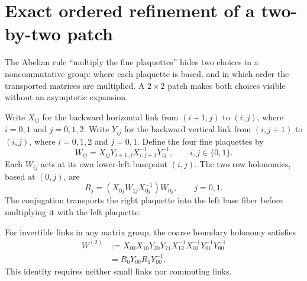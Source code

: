 


\section{Exact ordered refinement of a two-by-two patch}\label{g:ordered-refinement}

The Abelian rule ``multiply the fine plaquettes'' hides two choices in a noncommutative group: where each plaquette is based, and in which order the transported matrices are multiplied. A $2\times2$ patch makes both choices visible without an asymptotic expansion.

Write $X_{ij}$ for the backward horizontal link from $(i+1,j)$ to $(i,j)$, where $i=0,1$ and $j=0,1,2$. Write $Y_{ij}$ for the backward vertical link from $(i,j+1)$ to $(i,j)$, where $i=0,1,2$ and $j=0,1$. Define the four fine plaquettes by
\begin{equation}\label{g:fine-plaquette}
 W_{ij}=X_{ij}Y_{i+1,j}X_{i,j+1}^{-1}Y_{ij}^{-1},
 \qquad i,j\in\{0,1\}.
\end{equation}
Each $W_{ij}$ acts at its own lower-left basepoint $(i,j)$. The two row holonomies, based at $(0,j)$, are
\begin{equation}\label{g:row-holonomies}
 R_j=(X_{0j}W_{1j}X_{0j}^{-1})W_{0j},
 \qquad j=0,1.
\end{equation}
The conjugation transports the right plaquette into the left base fiber before multiplying it with the left plaquette.


\begin{theorem}\label{g:patch-theorem}
For invertible links in any matrix group, the coarse boundary holonomy satisfies
\begin{align}
 W^{(2)}
 &:=X_{00}X_{10}Y_{20}Y_{21}
 X_{12}^{-1}X_{02}^{-1}Y_{01}^{-1}Y_{00}^{-1}
 \label{g:coarse-boundary}\\
 &=R_0Y_{00}R_1Y_{00}^{-1}.\label{g:patch-identity}
\end{align}
This identity requires neither small links nor commuting links.
\end{theorem}

